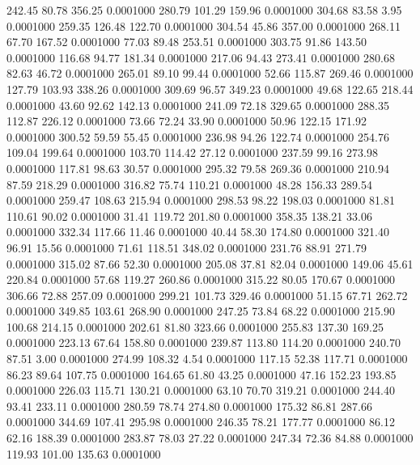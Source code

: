  242.45   80.78  356.25   0.0001000
 280.79  101.29  159.96   0.0001000
 304.68   83.58    3.95   0.0001000
 259.35  126.48  122.70   0.0001000
 304.54   45.86  357.00   0.0001000
 268.11   67.70  167.52   0.0001000
  77.03   89.48  253.51   0.0001000
 303.75   91.86  143.50   0.0001000
 116.68   94.77  181.34   0.0001000
 217.06   94.43  273.41   0.0001000
 280.68   82.63   46.72   0.0001000
 265.01   89.10   99.44   0.0001000
  52.66  115.87  269.46   0.0001000
 127.79  103.93  338.26   0.0001000
 309.69   96.57  349.23   0.0001000
  49.68  122.65  218.44   0.0001000
  43.60   92.62  142.13   0.0001000
 241.09   72.18  329.65   0.0001000
 288.35  112.87  226.12   0.0001000
  73.66   72.24   33.90   0.0001000
  50.96  122.15  171.92   0.0001000
 300.52   59.59   55.45   0.0001000
 236.98   94.26  122.74   0.0001000
 254.76  109.04  199.64   0.0001000
 103.70  114.42   27.12   0.0001000
 237.59   99.16  273.98   0.0001000
 117.81   98.63   30.57   0.0001000
 295.32   79.58  269.36   0.0001000
 210.94   87.59  218.29   0.0001000
 316.82   75.74  110.21   0.0001000
  48.28  156.33  289.54   0.0001000
 259.47  108.63  215.94   0.0001000
 298.53   98.22  198.03   0.0001000
  81.81  110.61   90.02   0.0001000
  31.41  119.72  201.80   0.0001000
 358.35  138.21   33.06   0.0001000
 332.34  117.66   11.46   0.0001000
  40.44   58.30  174.80   0.0001000
 321.40   96.91   15.56   0.0001000
  71.61  118.51  348.02   0.0001000
 231.76   88.91  271.79   0.0001000
 315.02   87.66   52.30   0.0001000
 205.08   37.81   82.04   0.0001000
 149.06   45.61  220.84   0.0001000
  57.68  119.27  260.86   0.0001000
 315.22   80.05  170.67   0.0001000
 306.66   72.88  257.09   0.0001000
 299.21  101.73  329.46   0.0001000
  51.15   67.71  262.72   0.0001000
 349.85  103.61  268.90   0.0001000
 247.25   73.84   68.22   0.0001000
 215.90  100.68  214.15   0.0001000
 202.61   81.80  323.66   0.0001000
 255.83  137.30  169.25   0.0001000
 223.13   67.64  158.80   0.0001000
 239.87  113.80  114.20   0.0001000
 240.70   87.51    3.00   0.0001000
 274.99  108.32    4.54   0.0001000
 117.15   52.38  117.71   0.0001000
  86.23   89.64  107.75   0.0001000
 164.65   61.80   43.25   0.0001000
  47.16  152.23  193.85   0.0001000
 226.03  115.71  130.21   0.0001000
  63.10   70.70  319.21   0.0001000
 244.40   93.41  233.11   0.0001000
 280.59   78.74  274.80   0.0001000
 175.32   86.81  287.66   0.0001000
 344.69  107.41  295.98   0.0001000
 246.35   78.21  177.77   0.0001000
  86.12   62.16  188.39   0.0001000
 283.87   78.03   27.22   0.0001000
 247.34   72.36   84.88   0.0001000
 119.93  101.00  135.63   0.0001000
